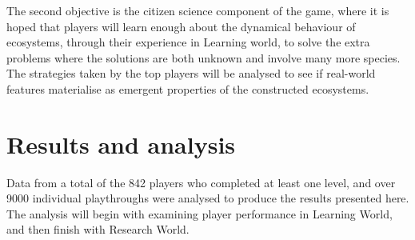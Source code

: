 The second objective is the citizen science component of the game, where it is hoped that players will learn enough about the dynamical behaviour of ecosystems, through their experience in Learning world, to solve the extra problems where the solutions are both unknown and involve many more species.
The strategies taken by the top players will be analysed to see if real-world features materialise as emergent properties of the constructed ecosystems.

\section{Results and analysis}
\label{sec:eco_results}

Data from a total of the 842 players who completed at least one level, and over 9000 individual playthroughs were analysed to produce the results presented here. The analysis will begin with examining player performance in Learning World, and then finish with Research World.

